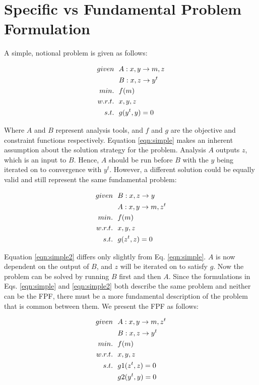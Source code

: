 \section{Specific vs Fundamental Problem Formulation }
    A simple, notional problem is given as follows: 

    \begin{align}
        given & \ \ A: {x,y} \rightarrow {m,z} \notag
        \\      & \ \ B: {x,z} \rightarrow {y^t} \notag
        \\min. &\ \ f(m) \notag
        \\w.r.t. & \ \ x,y,z \notag
        \\s.t. & \ \ g(y^t,y) = 0
        \label{eqn:simple}
    \end{align}

    Where $A$ and $B$ represent analysis tools, and $f$ and $g$ are the objective and constraint functions respectively. 
    Equation \ref{eqn:simple} makes an inherent assumption about the solution strategy for the problem. 
    Analysis $A$ outputs $z$, which is an input to $B$. Hence, $A$ should be run before $B$ with 
    the $y$ being iterated on to convergence with $y^t$. However, a different solution could be equally valid and still represent
    the same fundamental problem: 

    \begin{align}
        given & \ \ B: {x,z} \rightarrow {y} \notag
        \\      & \ \ A: {x,y} \rightarrow {m,z^t} \notag
        \\min. &\ \ f(m) \notag
        \\w.r.t. & \ \ x,y,z \notag
        \\s.t. & \ \ g(z^t,z) = 0
        \label{eqn:simple2}
    \end{align}

    Equation \ref{eqn:simple2} differs only slightly from Eq. \ref{eqn:simple}. $A$ is now dependent on the output of $B$, 
    and $z$ will be iterated on to satisfy $g$. Now the problem can be solved by running $B$ first and then $A$.
    Since the formulations in Eqs. \ref{eqn:simple} and \ref{eqn:simple2} both describe the same problem and neither can be the
    FPF, there must be a more fundamental description of the problem that is common between them. We present the FPF as follows: 

    \begin{align}
        given & \ \ A: {x,y} \rightarrow {m,z^t} \notag
        \\      & \ \ B: {x,z} \rightarrow {y^t} \notag
        \\min. &\ \ f(m) \notag
        \\w.r.t. & \ \ x,y,z \notag
        \\s.t. & \ \ g1(z^t,z) = 0 \notag
        \\     & \ \ g2(y^t,y) = 0
        \label{eqn:simple_fpf}
    \end{align}


